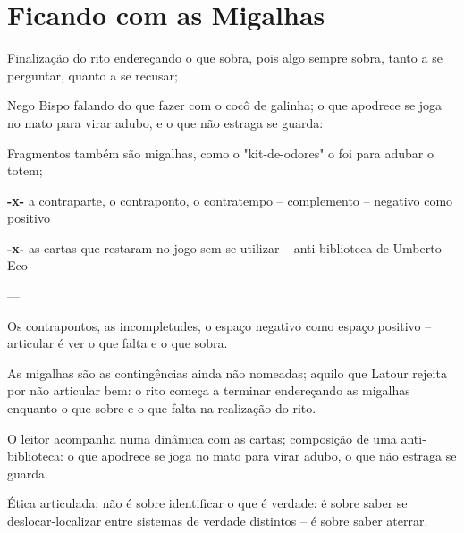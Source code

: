 \chapter{Ficando com as Migalhas}
\label{cap:migalhas}

Finalização do rito endereçando o que sobra, pois algo sempre sobra, tanto a se perguntar, quanto a se recusar;

Nego Bispo falando do que fazer com o cocô de galinha;
    o que apodrece se joga no mato para virar adubo, e o que não estraga se guarda:

Fragmentos também são migalhas, como o "kit-de-odores" o foi para adubar o totem;

\textbf{-x-} a contraparte, o contraponto, o contratempo -- complemento -- negativo como positivo

\textbf{-x-} as cartas que restaram no jogo sem se utilizar -- anti-biblioteca de Umberto Eco

---

Os contrapontos, as incompletudes, o espaço negativo como espaço positivo -- articular é ver o que falta e o que sobra.

As migalhas são as contingências ainda não nomeadas;
    aquilo que Latour rejeita por não articular bem:
        o rito começa a terminar endereçando as migalhas enquanto o que sobre e o que falta na realização do rito.

O leitor acompanha numa dinâmica com as cartas;
    composição de uma anti-biblioteca:
        o que apodrece se joga no mato para virar adubo, o que não estraga se guarda.

Ética articulada;
    não é sobre identificar o que é verdade:
        é sobre saber se deslocar-localizar entre sistemas de verdade distintos -- é sobre saber aterrar.
